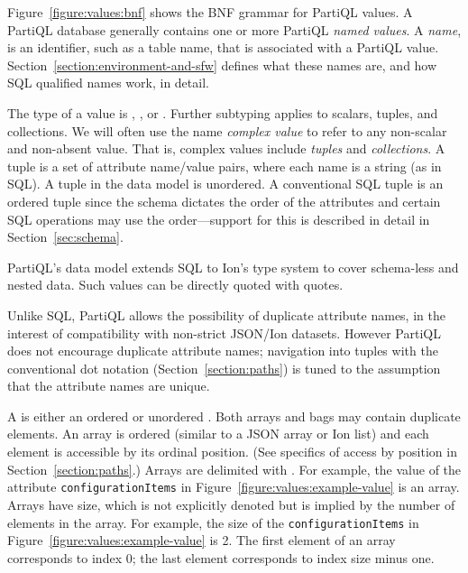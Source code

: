 Figure~\ref{figure:values:bnf} shows the BNF grammar for PartiQL values. A
PartiQL database generally contains one or more PartiQL \textit{named values}. A
\textit{name}, is an identifier, such as a table name, that is associated with a
PartiQL value.  Section~\ref{section:environment-and-sfw} defines what these
names are, and how SQL qualified names work, in detail.

The type of a value is , ,  or .
Further subtyping applies to scalars, tuples, and collections. We will often use
the name \emph{complex value} to refer to any non-scalar and non-absent value.
That is, complex values include \textit{tuples} and \textit{collections}. A
tuple is a set of attribute name/value pairs, where each name is a string (as in
SQL). A tuple in the data model is unordered. A conventional SQL tuple is an
ordered tuple since the schema dictates the order of the attributes and certain
SQL operations may use the order---support for this is described in detail in
Section~\ref{sec:schema}.



PartiQL's data model extends SQL to Ion's type system to cover schema-less and 
nested data. Such values can be directly quoted with \bt quotes.

Unlike SQL, PartiQL allows the possibility of duplicate attribute names, in the
interest of compatibility with non-strict JSON/Ion datasets. However PartiQL
does not encourage duplicate attribute names; navigation into tuples with the
conventional dot notation (Section~\ref{section:paths}) is tuned to the
assumption that the attribute names are unique. 

A  is either an ordered or unordered
. Both arrays and bags may contain duplicate elements. An
array is ordered (similar to a JSON array or Ion list) and each element is
accessible by its ordinal position. (See specifics of access by position in
Section~\ref{section:paths}.) Arrays are delimited with \gl{[} \gl{]}. For
example, the value of the attribute \texttt{configurationItems} in
Figure~\ref{figure:values:example-value} is an array. Arrays have size, which
is not explicitly denoted but is implied by the number of elements in the array.
For example, the size of the \texttt{configurationItems} in
Figure~\ref{figure:values:example-value} is 2. The first element of an array
corresponds to index 0; the last element corresponds to index size minus one.

